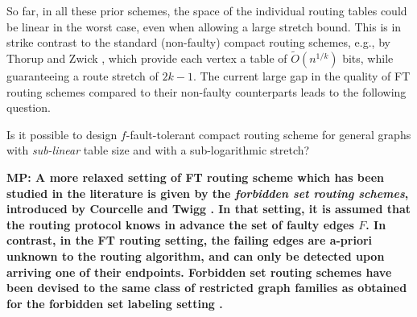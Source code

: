 So far, in all these prior schemes, the space of the individual routing tables could be linear in the worst case, even when allowing a large stretch bound. This is in strike contrast to the standard (non-faulty) compact routing schemes, e.g., by Thorup and Zwick \cite{thorup2001compact}, which provide each vertex a table of $\widetilde{O}(n^{1/k})$ bits, while guaranteeing a route stretch of $2k-1$. The current large gap in the quality of FT routing schemes compared to their non-faulty counterparts leads to the following question.

\begin{question}\label{q:route}
Is it possible to design $f$-fault-tolerant compact routing scheme for general graphs with \emph{sub-linear} table size and with a sub-logarithmic stretch?
\end{question}

\textbf{MP: A more relaxed setting of FT routing scheme which has been studied in the literature is given by the \emph{forbidden set routing schemes}, introduced by Courcelle and Twigg \cite{CourcelleT07}. In that setting, it is assumed that the routing protocol knows in advance the set of faulty edges $F$. In contrast, in the FT routing setting, the failing edges are a-priori unknown to the routing algorithm,  and can only be detected upon arriving one of their endpoints. Forbidden set routing schemes have been devised to the same class of restricted graph families as obtained for the forbidden set labeling setting \cite{CourcelleT07,AbrahamCGP16,abraham2012fully}.}






